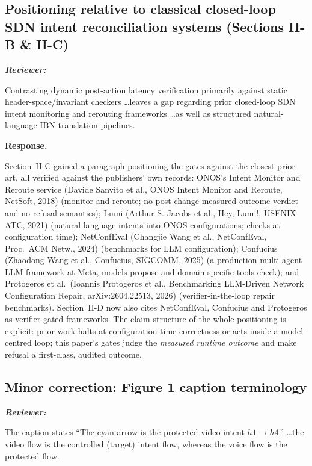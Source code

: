 \documentclass[11pt,a4paper]{article}
\newenvironment{reviewer}{\par\medskip\noindent\begin{minipage}{\linewidth}\small\itshape\color{quote}\textbf{Reviewer:}\par}{\end{minipage}\medskip\par}
\newenvironment{response}{\par\noindent\begin{minipage}{\linewidth}\small\textbf{Response.}\par}{\end{minipage}\medskip\par}
\begin{document}
\subsection{Positioning relative to classical closed-loop SDN intent
reconciliation systems (Sections II-B \& II-C)}

\begin{reviewer}
Contrasting dynamic post-action latency verification primarily against
static header-space/invariant checkers \ldots leaves a gap regarding prior
closed-loop SDN intent monitoring and rerouting frameworks \ldots as well as
structured natural-language IBN translation pipelines.
\end{reviewer}

\begin{response}
Section~II-C gained a paragraph positioning the gates against the closest
prior art, all verified against the publishers' own records: ONOS's Intent
Monitor and Reroute service (Davide Sanvito et al., ONOS Intent Monitor and Reroute, NetSoft, 2018) (monitor and reroute;
no post-change measured outcome verdict and no refusal semantics); Lumi
(Arthur S. Jacobs et al., Hey, Lumi!, USENIX ATC, 2021) (natural-language intents into ONOS configurations;
checks at configuration time); NetConfEval (Changjie Wang et al., NetConfEval, Proc.~ACM Netw., 2024)
(benchmarks for LLM configuration); Confucius (Zhaodong Wang et al., Confucius, SIGCOMM, 2025) (a
production multi-agent LLM framework at Meta, models propose and
domain-specific tools check); and Protogeros et al.\ (Ioannis Protogeros et al., Benchmarking LLM-Driven Network Configuration Repair, arXiv:2604.22513, 2026)
(verifier-in-the-loop repair benchmarks). Section~II-D now also cites
NetConfEval, Confucius and Protogeros as verifier-gated frameworks. The
claim structure of the whole positioning is explicit: prior work halts at
configuration-time correctness or acts inside a model-centred loop; this
paper's gates judge the \emph{measured runtime outcome} and make refusal a
first-class, audited outcome.
\end{response}

\subsection{Minor correction: Figure 1 caption terminology}

\begin{reviewer}
The caption states ``The cyan arrow is the protected video intent
$h1\to h4$.'' \ldots the video flow is the controlled (target) intent
flow, whereas the voice flow is the protected flow.
\end{reviewer}
\end{document}

